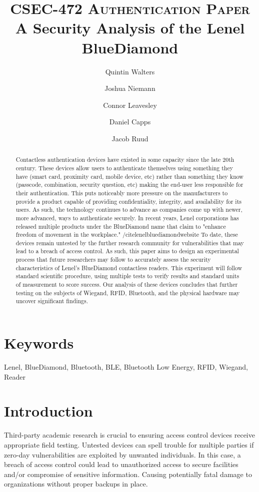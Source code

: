 \documentclass[10pt,twocolumn,letterpaper]{article}
\title{
		\vspace{-1in}
		\usefont{OT1}{bch}{b}{n}
		\normalfont \normalsize \textsc{CSEC-472 Authentication Paper} \\ [14pt]
		\huge A Security Analysis of the Lenel BlueDiamond \\
}
\author[1]{Quintin Walters}
\author[1]{Joshua Niemann}
\author[1]{Connor Leavesley}
\author[1]{Daniel Capps}
\author[1]{Jacob Ruud}
\affil[1]{\small{Computing Security, Rochester Institute of Technology}}
\begin{document}
\maketitle
{}
\begin{abstract}
Contactless authentication devices have existed in some capacity since the late 20th century. These devices allow users to authenticate themselves using something they have (smart card, proximity card, mobile device, etc) rather than something they know (passcode, combination, security question, etc) making the end-user less responsible for their authentication. This puts noticeably more pressure on the manufacturers to provide a product capable of providing confidentiality, integrity, and availability for its users. As such, the technology continues to advance as companies come up with newer, more advanced, ways to authenticate securely. In recent years, Lenel corporations has released multiple products under the BlueDiamond name that claim to "enhance freedom of movement in the workplace." /cite{lenelbluediamondwebsite} To date, these devices remain untested by the further research community for vulnerabilities that may lead to a breach of access control. As such, this paper aims to design an experimental process that future researchers may follow to accurately assess the security characteristics of Lenel's BlueDiamond contactless readers. This experiment will follow standard scientific procedure, using multiple tests to verify results and standard units of measurement to score success. Our analysis of these devices concludes that further testing on the subjects of Wiegand, RFID, Bluetooth, and the physical hardware may uncover significant findings.
\end{abstract}

\section*{Keywords}
Lenel, BlueDiamond, Bluetooth, BLE, Bluetooth Low Energy, RFID, Wiegand, Reader

\section{Introduction}
Third-party academic research is crucial to ensuring access control devices receive appropriate field testing. Untested devices can spell trouble for multiple parties if zero-day vulnerabilities are exploited by unwanted individuals. In this case, a breach of access control could lead to unauthorized access to secure facilities and/or compromise of sensitive information. Causing potentially fatal damage to organizations without proper backups in place.
\end{document}
